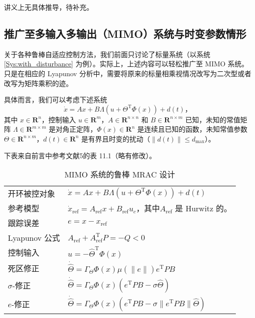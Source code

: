 讲义上无具体推导，待补充。

\subsection{推广至多输入多输出（MIMO）系统与时变参数情形}

关于各种鲁棒自适应控制方法，我们前面只讨论了标量系统（以系统 \eqref{Sys:with_disturbance} 为例）。实际上，上述内容可以轻松推广至 MIMO 系统。只是在相应的 Lyapunov 分析中，需要将原来的标量相乘视情况改写为二次型或者改写为矩阵乘积的迹。

具体而言，我们可以考虑下述系统
\begin{equation}
    \dot{x} = A x + B \Lambda \left( u + \Theta^\mathrm{T} \Phi(x) \right) + d(t) \text{，}
\end{equation}
其中 $x \in \mathbf{R}^n$，控制输入 $u \in \mathbf{R}^m$，$A \in \mathbf{R}^{n \times n}$ 和 $B \in \mathbf{R}^{n \times m}$ 已知，未知的常值矩阵 $\Lambda \in \mathbf{R}^{m \times m}$ 是对角正定阵，$\Phi(x) \in \mathbf{R}^n$ 是连续且已知的函数，未知常值参数 $\Theta \in \mathbf{R}^{n \times m}$，$d(t) \in \mathbf{R}^n$ 是有界且时变的扰动（$\| d(t) \| \leq d_{\mathrm{max}}$）。

下表来自前言中参考文献5的表 11.1（略有修改）。

\begin{table}[htbp]
  \centering
  \setcellgapes{4pt}
  \makegapedcells
  \caption{MIMO 系统的鲁棒 MRAC 设计}
  \begin{tabular}{p{4.0cm}p{10.0cm}}
  \hline
   开环被控对象 & $\dot{x} =  A x + B \Lambda \left( u + \Theta^\mathrm{T} \Phi(x) \right) + d(t)$\\
    参考模型 & $\dot{x}_{\ensuremath{\operatorname{ref}}} = 
    A_{\ensuremath{\operatorname{ref}}} x +
    B_{\ensuremath{\operatorname{ref}}} u_c$，其中$A_{\ensuremath{\operatorname{ref}}}$ 是 Hurwitz 的。\\
    跟踪误差 & $e = x - x_{\ensuremath{\operatorname{ref}}}$\\
    Lyapunov 公式 & $A_{\ensuremath{\operatorname{ref}}} + A_{\ensuremath{\operatorname{ref}}}^{\mathrm{T}} P = -Q < 0$\\
    控制输入 & $u = -{\hat{\Theta}}^{\mathrm{T}} \Phi(x)$\\
    死区修正 & $\dot{\hat{\Theta}} = \Gamma_\Theta \Phi(x) \mu\left( \| e \| \right) e^{\mathrm{T}} P B$\\
    $\sigma$-修正 & $\dot{\hat{\Theta}} = \Gamma_\Theta \Phi(x) \left( e^{\mathrm{T}} P B -\sigma \hat{\Theta} \right)$\\
    $e$-修正 & $\dot{\hat{\Theta}} = \Gamma_\Theta \Phi(x) \left( e^{\mathrm{T}} P B -\sigma \| e^{\mathrm{T}} P B \| \hat{\Theta} \right)$\\
    \hline
  \end{tabular}
\end{table}

